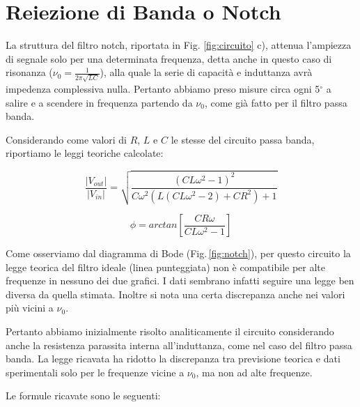 \section{Reiezione di Banda o Notch}
La struttura del filtro notch, riportata in Fig. \ref{fig:circuito} c), attenua l'ampiezza di segnale solo per una determinata frequenza, detta anche in questo caso di risonanza ($\nu_0=\frac{1}{2 \pi \sqrt{LC}}$), alla quale la serie di capacità e induttanza avrà impedenza complessiva nulla. Pertanto abbiamo preso misure circa ogni 5$^\circ$ a salire e a scendere in frequenza partendo da $\nu_0$, come già fatto per il filtro passa banda.

Considerando come valori di $R$, $L$ e $C$ le stesse del circuito passa banda, riportiamo le leggi teoriche calcolate:\\

\noindent
\begin{minipage}{.5\linewidth}
\begin{equation}
\frac{|V_{out}|}{|V_{in}|}=\sqrt{\frac{\left(C L \omega ^2-1\right)^2}{C \omega ^2 \left(L \left(C L \omega ^2-2\right)+C R^2\right)+1}}
\label{notchGain}
\end{equation}
\end{minipage}%
\begin{minipage}{.5\linewidth}
\begin{equation}
\phi=arctan\left[\frac{C R \omega}{C L \omega ^2-1}\right]
\label{notchPhi}
\end{equation}
\end{minipage}
\break

Come osserviamo dal diagramma di Bode (Fig.$\,$\ref{fig:notch}), per questo circuito la legge teorica del filtro ideale (linea punteggiata) non è compatibile per alte frequenze in nessuno dei due grafici. I dati sembrano infatti seguire una legge ben diversa da quella stimata. Inoltre si nota una certa discrepanza anche nei valori più vicini a $\nu_0$.

Pertanto abbiamo inizialmente risolto analiticamente il circuito considerando anche la resistenza parassita interna all'induttanza, come nel caso del filtro passa banda. La legge ricavata ha ridotto la discrepanza tra previsione teorica e dati sperimentali solo per le frequenze vicine a $\nu_0$, ma non ad alte frequenze.

Le formule ricavate sono le seguenti:

